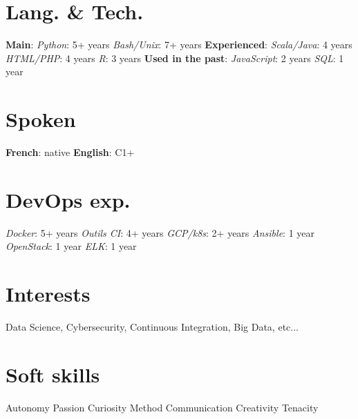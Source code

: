 \documentclass[]{friggeri-cv}
\begin{document}
\begin{aside}
    \section{Lang. \& Tech.}
    \textbf{Main}:
    \emph{Python}: 5+ years
    \emph{Bash/Unix}: 7+ years
    \textbf{Experienced}:
    \emph{Scala/Java}: 4 years
    \emph{HTML/PHP}: 4 years
    \emph{R}: 3 years
    \textbf{Used in the past}:
    \emph{JavaScript}: 2 years
    \emph{SQL}: 1 year
    ~
  \section{Spoken}
  \textbf{French}: native
  \textbf{English}: C1+
   ~
   \section{DevOps exp.}
   \emph{Docker}: 5+ years
   \emph{Outils CI}: 4+ years
   \emph{GCP/k8s}: 2+ years
   \emph{Ansible}: 1 year
   \emph{OpenStack}: 1 year
   \emph{ELK}: 1 year
    ~
  \section{Interests}
  Data Science, 
  Cybersecurity, 
  Continuous Integration,
  Big Data, etc...
  ~
  \section{Soft skills}
  Autonomy
  Passion
  Curiosity
  Method
  Communication 
  Creativity
  Tenacity
    ~
\end{aside}
\end{document}
